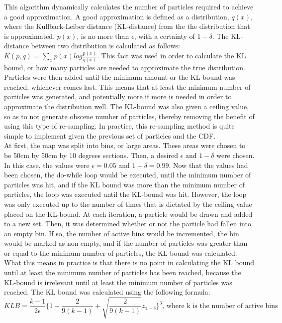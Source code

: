 \documentclass{article}
\begin{document}
This algorithm dynamically calculates the number of particles required to achieve a good approximation. A good approximation is defined as a distribution, $q(x)$, where the Kullback-Leiber distance (KL-distance) from the the distribution that is approximated, $p(x)$, is no more than $\epsilon$, with a certainty of $1 - \delta$\citep{KLD}. The KL-distance between two distribution is calculated as follows: $K(p, q) = \sum_{x}p(x)log\frac{p(x)}{q(x)}$\citep{KLD}. This fact was used in order to calculate the KL bound, or how many particles are needed to approximate the true distribution. Particles were then added until the minimum amount or the KL bound was reached, whichever comes last. This means that at least the minimum number of particles was generated, and potentially more if more is needed in order to approximate the distribution well. The KL-bound was also given a ceiling value, so as to not generate obscene number of particles, thereby removing the benefit of using this type of re-sampling. In practice, this re-sampling method is quite simple to implement given the previous set of particles and the CDF.\\ 

At first, the map was split into bins, or large areas. These areas were chosen to be 50cm by 50cm by 10 degrees sections. Then, a desired $\epsilon$ and $1-\delta$ were chosen. In this case, the values were $\epsilon = 0.05$ and $1-\delta = 0.99$. Now that the values had been chosen, the do-while loop would be executed, until the minimum number of particles was hit, and if the KL bound was more than the minimum number of particles, the loop was executed until the KL-bound was hit. However, the loop was only executed up to the number of times that is dictated by the ceiling value placed on the KL-bound. At each iteration, a particle would be drawn and added to a new set. Then, it was determined whether or not the particle had fallen into an empty bin. If so, the number of active bins would be incremented, the bin would be marked as non-empty, and if the number of particles was greater than or equal to the minimum number of particles, the KL-bound was calculated. What this means in practice is that there is no point in calculating the KL bound until at least the minimum number of particles has been reached, because the KL-bound is irrelevant until at least the minimum number of particles was reached. The KL bound was calculated using the following formula:\\ $$KLB = \frac{k-1}{2\epsilon}\Bigg\{1 - \frac{2}{9(k-1)} + \sqrt{\frac{2}{9(k-1)}}z_{1-\delta}\Bigg\}^3\textrm{, where k is the number of active bins}$$
\end{document}
